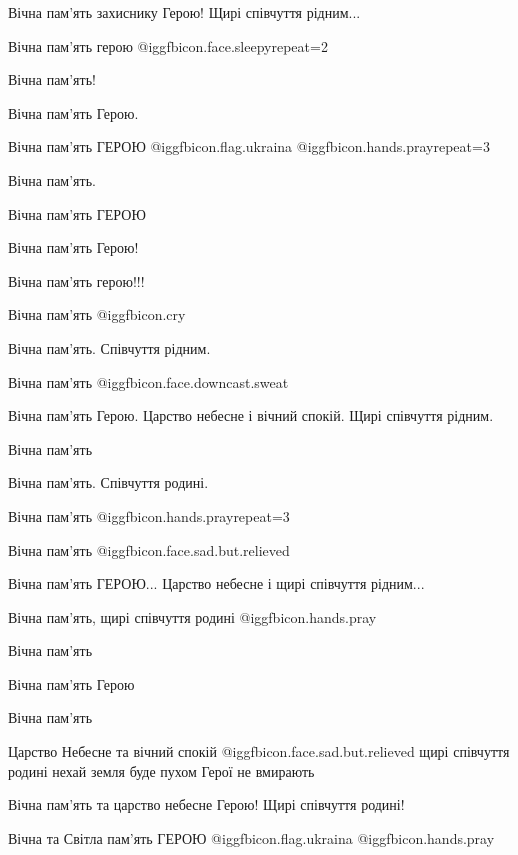 \begin{itemize}
Вічна пам'ять захиснику Герою! Щирі співчуття рідним...

Вічна пам'ять герою  @igg{fbicon.face.sleepy}{repeat=2} 

Вічна пам'ять!

Вічна пам'ять Герою.

Вічна пам'ять ГЕРОЮ @igg{fbicon.flag.ukraina} @igg{fbicon.hands.pray}{repeat=3} 

Вічна пам'ять.

Вічна пам'ять ГЕРОЮ

Вічна пам'ять Герою!

Вічна пам'ять герою!!!

Вічна пам'ять @igg{fbicon.cry} 

Вічна пам'ять. Співчуття рідним.

Вічна пам'ять  @igg{fbicon.face.downcast.sweat} 


Вічна пам'ять Герою. Царство небесне і вічний спокій. Щирі співчуття рідним.

Вічна пам'ять

Вічна пам'ять. Співчуття родині.

Вічна пам'ять  @igg{fbicon.hands.pray}{repeat=3} 

Вічна пам'ять @igg{fbicon.face.sad.but.relieved} 

Вічна пам'ять ГЕРОЮ... Царство небесне і щирі співчуття рідним...

Вічна пам'ять, щирі співчуття родині @igg{fbicon.hands.pray} 

Вічна пам'ять

Вічна пам'ять Герою

Вічна пам'ять


Царство Небесне та вічний спокій  @igg{fbicon.face.sad.but.relieved}  щирі
співчуття родині нехай земля буде пухом Герої не вмирають

Вічна пам'ять та царство небесне Герою! Щирі співчуття родині!

Вічна та Світла пам'ять ГЕРОЮ @igg{fbicon.flag.ukraina} @igg{fbicon.hands.pray} 


\end{itemize}
